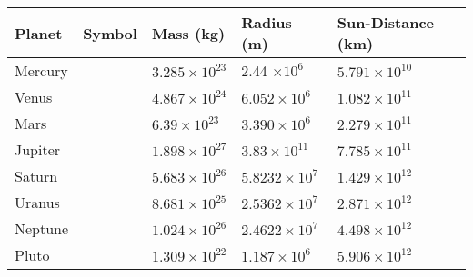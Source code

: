 \begin{fancybox}{}
	\begin{center}
		\begin{tabular}{   l  |  c  |  l  |  l  | l}
			Planet & Symbol & Mass (kg) & Radius (m) & Sun-Distance (km) \\
			\hline
			Mercury & \mercury & $3.285 \times 10^{23}$ & 2.44 $\times 10^{6}$ & $5.791 \times 10^{10}$ \\
			Venus & \venus & $4.867 \times 10^{24}$ & $6.052 \times 10^{6}$ & $1.082 \times 10^{11}$   \\
			Mars & \mars & $6.39 \times 10^{23}$ & $3.390 \times 10^{6}$ & $2.279 \times 10^{11}$ \\
			Jupiter& \jupiter &$1.898 \times 10^{27}$ & $3.83 \times 10^{11}$ & $7.785 \times 10^{11}$  \\
			Saturn & \saturn & $5.683 \times 10^{26}$ & $5.8232 \times 10^{7}$ & $1.429 \times 10^{12}$  \\
			Uranus & \uranus & $8.681 \times 10^{25}$ & $2.5362 \times 10^{7}$ & $2.871 \times 10^{12}$  \\
			Neptune & \neptune & $1.024 \times 10^{26}$ & $2.4622 \times 10^{7}$ & $4.498 \times 10^{12}$  \\
			Pluto & \pluto & $1.309 \times 10^{22}$ & $1.187 \times 10^6$ & $5.906 \times 10^{12}$ 
		\end{tabular}
	\end{center}
\end{fancybox}

